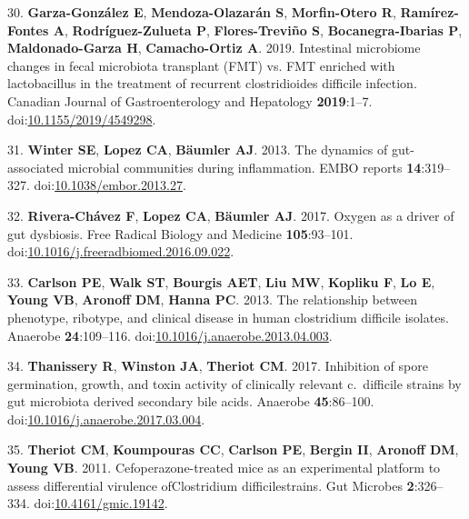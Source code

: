 \documentclass[11pt,]{article}
\newlength{\cslhangindent}
\newenvironment{cslreferences}%
  {\setlength{\parindent}{0pt}%
  \everypar{\setlength{\hangindent}{\cslhangindent}}\ignorespaces}%
  {\par}
\begin{document}
\begin{cslreferences}
\leavevmode\hypertarget{ref-garzagonzlez2019}{}%
30. \textbf{Garza-González E}, \textbf{Mendoza-Olazarán S},
\textbf{Morfin-Otero R}, \textbf{Ramírez-Fontes A},
\textbf{Rodríguez-Zulueta P}, \textbf{Flores-Treviño S},
\textbf{Bocanegra-Ibarias P}, \textbf{Maldonado-Garza H},
\textbf{Camacho-Ortiz A}. 2019. Intestinal microbiome changes in fecal
microbiota transplant (FMT) vs. FMT enriched with lactobacillus in the
treatment of recurrent clostridioides difficile infection. Canadian
Journal of Gastroenterology and Hepatology \textbf{2019}:1--7.
doi:\href{https://doi.org/10.1155/2019/4549298}{10.1155/2019/4549298}.

\leavevmode\hypertarget{ref-winter2013}{}%
31. \textbf{Winter SE}, \textbf{Lopez CA}, \textbf{Bäumler AJ}. 2013.
The dynamics of gut-associated microbial communities during
inflammation. EMBO reports \textbf{14}:319--327.
doi:\href{https://doi.org/10.1038/embor.2013.27}{10.1038/embor.2013.27}.

\leavevmode\hypertarget{ref-riverachavez2017}{}%
32. \textbf{Rivera-Chávez F}, \textbf{Lopez CA}, \textbf{Bäumler AJ}.
2017. Oxygen as a driver of gut dysbiosis. Free Radical Biology and
Medicine \textbf{105}:93--101.
doi:\href{https://doi.org/10.1016/j.freeradbiomed.2016.09.022}{10.1016/j.freeradbiomed.2016.09.022}.

\leavevmode\hypertarget{ref-carlson2013}{}%
33. \textbf{Carlson PE}, \textbf{Walk ST}, \textbf{Bourgis AET},
\textbf{Liu MW}, \textbf{Kopliku F}, \textbf{Lo E}, \textbf{Young VB},
\textbf{Aronoff DM}, \textbf{Hanna PC}. 2013. The relationship between
phenotype, ribotype, and clinical disease in human clostridium difficile
isolates. Anaerobe \textbf{24}:109--116.
doi:\href{https://doi.org/10.1016/j.anaerobe.2013.04.003}{10.1016/j.anaerobe.2013.04.003}.

\leavevmode\hypertarget{ref-thanissery2017}{}%
34. \textbf{Thanissery R}, \textbf{Winston JA}, \textbf{Theriot CM}.
2017. Inhibition of spore germination, growth, and toxin activity of
clinically relevant c.~difficile strains by gut microbiota derived
secondary bile acids. Anaerobe \textbf{45}:86--100.
doi:\href{https://doi.org/10.1016/j.anaerobe.2017.03.004}{10.1016/j.anaerobe.2017.03.004}.

\leavevmode\hypertarget{ref-theriot2011}{}%
35. \textbf{Theriot CM}, \textbf{Koumpouras CC}, \textbf{Carlson PE},
\textbf{Bergin II}, \textbf{Aronoff DM}, \textbf{Young VB}. 2011.
Cefoperazone-treated mice as an experimental platform to assess
differential virulence ofClostridium difficilestrains. Gut Microbes
\textbf{2}:326--334.
doi:\href{https://doi.org/10.4161/gmic.19142}{10.4161/gmic.19142}.


\end{cslreferences}
\end{document}
